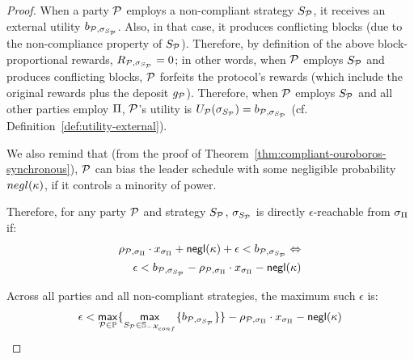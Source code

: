 \begin{proof}
    When a party $\mathcal{P}$ employs a non-compliant strategy $S_{\mathcal{P}}$,
    it receives an external utility $b_{\mathcal{P},
    \sigma_{S_{\mathcal{P}}}}$. Also, in that case, it produces
    conflicting blocks (due to the non-compliance property of
    $S_{\mathcal{P}}$). Therefore, by definition of the above
    block-proportional rewards, $R_{\mathcal{P}, \sigma_{S_{\mathcal{P}}}}
    = 0$; in other words, when $\mathcal{P}$ employs $S_{\mathcal{P}}$ and produces
    conflicting blocks, $\mathcal{P}$ forfeits the protocol's rewards (which include
    the original rewards plus the deposit $g_{\mathcal{P}}$). Therefore, when
    $\mathcal{P}$ employs $S_{\mathcal{P}}$ and all other parties employ $\Pi$,
    $\mathcal{P}$'s utility is
    $U_{\mathcal{P}}(\sigma_{S_{\mathcal{P}}}) = b_{\mathcal{P}, \sigma_{S_{\mathcal{P}}}}$
    (cf. Definition~\ref{def:utility-external}).

    We also remind that (from the proof of
    Theorem~\ref{thm:compliant-ouroboros-synchronous}), $\mathcal{P}$ can bias the
    leader schedule with some negligible probability $negl(\kappa)$, if it
    controls a minority of power.

    Therefore, for any party $\mathcal{P}$ and strategy $S_{\mathcal{P}}$,
    $\sigma_{S_{\mathcal{P}}}$ is directly $\epsilon$-reachable from
    $\sigma_{\Pi}$ if:
    \begin{align}
        \rho_{\mathcal{P}, \sigma_{\Pi}} \cdot x_{\sigma_\Pi} + \mathsf{negl}(\kappa) + \epsilon < b_{\mathcal{P}, \sigma_{S_{\mathcal{P}}}} \Leftrightarrow \nonumber \\
        \epsilon < b_{\mathcal{P}, \sigma_{S_{\mathcal{P}}}} - \rho_{\mathcal{P}, \sigma_{\Pi}} \cdot x_{\sigma_\Pi} - \mathsf{negl}(\kappa) \nonumber
    \end{align}

    Across all parties and all non-compliant strategies, the maximum such $\epsilon$ is:
    \begin{align}
        \epsilon < \underset{\mathcal{P} \in \mathbb{P}}{\mathsf{max}}\{ \underset{S_{\mathcal{P}} \in \mathbb{S}_{-\mathcal{X}_{conf}}}{\mathsf{max}}\{ b_{\mathcal{P}, \sigma_{S_{\mathcal{P}}}} \} \} - \rho_{\mathcal{P}, \sigma_{\Pi}} \cdot x_{\sigma_\Pi} - \mathsf{negl}(\kappa) \nonumber
    \end{align}


\end{proof}
